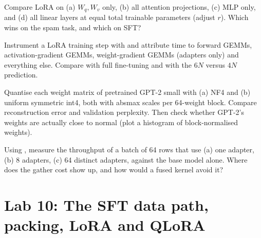 \begin{exercise}
Compare LoRA on (a) $W_q,W_v$ only, (b) all attention projections, (c) MLP only, and
(d) all linear layers at equal total trainable parameters (adjust $r$). Which wins on
the spam task, and which on SFT?
\end{exercise}

\begin{exercise}
Instrument a LoRA training step with  and attribute time to
forward GEMMs, activation-gradient GEMMs, weight-gradient GEMMs (adapters only) and
everything else. Compare with full fine-tuning and with the $6N$ versus $4N$
prediction.
\end{exercise}

\begin{exercise}
Quantise each weight matrix of pretrained GPT-2 small with (a) NF4 and (b) uniform
symmetric int4, both with absmax scales per 64-weight block. Compare reconstruction
error and validation perplexity. Then check whether GPT-2's weights are actually close
to normal (plot a histogram of block-normalised weights).
\end{exercise}

\begin{exercise}
Using , measure the throughput of a batch of 64 rows that use
(a) one adapter, (b) 8 adapters, (c) 64 distinct adapters, against the base model alone.
Where does the gather cost show up, and how would a fused kernel avoid it?
\end{exercise}

\section{Lab 10: The SFT data path, packing, LoRA and QLoRA}\label{sec:instruct:lab}

